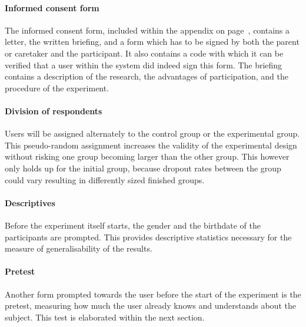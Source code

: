 \paragraph{Informed consent form} The informed consent form, included within the  appendix on page~\pageref{app:consentform}, contains a letter, the written briefing, and a form which has to be signed by both the parent or caretaker and the participant. It also contains a code with which it can be verified that a user within the system did indeed sign this form. The briefing contains a description of the research, the advantages of participation, and the procedure of the experiment.

\paragraph{Division of respondents} Users will be assigned alternately to the control group or the experimental group. This pseudo-random assignment increases the validity of the experimental design without risking one group becoming larger than the other group. This however only holds up for the initial group, because dropout rates between the group could vary resulting in differently sized finished groups.

\paragraph{Descriptives} Before the experiment itself starts, the gender and the birthdate of the participants are prompted. This provides descriptive statistics necessary for the measure of generalisability of the results.

\paragraph{Pretest} Another form prompted towards the user before the start of the experiment is the pretest, measuring how much the user already knows and understands about the subject. This test is elaborated within the next section.

